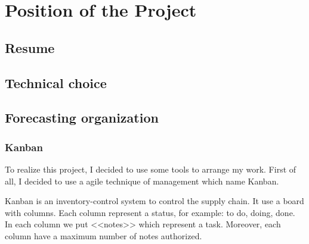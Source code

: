 
\chapter{Position of the Project}
\label{chap:project}


\section{Resume}

\section{Technical choice}

\section{Forecasting organization}

\subsection{Kanban}

To realize this project, I decided to use some tools to arrange my work. First
of all, I decided to use a agile technique of management which name Kanban.~\\



Kanban is an inventory-control system to control the supply chain. It use a
board with columns. Each column represent a status, for example: to do, doing,
done. In each column we put <<notes>> which represent a task. Moreover, each
column have a maximum number of notes authorized.






